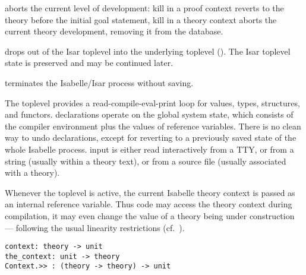 \begin{isabellebody}
\begin{isamarkuptext}
\begin{description}
  \item {} aborts the current level of development:
  kill in a proof context reverts to the theory before the initial
  goal statement, kill in a theory context aborts the current theory
  development, removing it from the database.

  \item {} drops out of the Isar toplevel into the
  underlying {\ML} toplevel ().  The Isar
  toplevel state is preserved and may be continued later.

  \item {} terminates the Isabelle/Isar process without
  saving.

  \end{description}%
\end{isamarkuptext}%
\isamarkuptrue%
%
\isamarkuptrue%
%
\begin{isamarkuptext}%
The {\ML} toplevel provides a read-compile-eval-print loop for
  {\ML} values, types, structures, and functors.  {\ML} declarations
  operate on the global system state, which consists of the compiler
  environment plus the values of {\ML} reference variables.  There is
  no clean way to undo {\ML} declarations, except for reverting to a
  previously saved state of the whole Isabelle process.  {\ML} input
  is either read interactively from a TTY, or from a string (usually
  within a theory text), or from a source file (usually associated
  with a theory).

  Whenever the {\ML} toplevel is active, the current Isabelle theory
  context is passed as an internal reference variable.  Thus {\ML}
  code may access the theory context during compilation, it may even
  change the value of a theory being under construction --- following
  the usual linearity restrictions (cf.~).%
\end{isamarkuptext}%
\isamarkuptrue%
%
\isadelimmlref
%
\endisadelimmlref
%
\isatagmlref
%
\begin{isamarkuptext}%
\begin{mldecls}
  \verb|context: theory -> unit| \\
  \verb|the_context: unit -> theory| \\
  \verb|Context.>> : (theory -> theory) -> unit| \\
  \end{mldecls}


\end{isamarkuptext}
\end{isabellebody}
